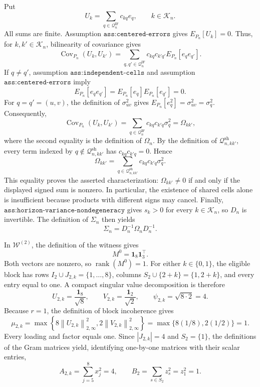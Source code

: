 Put
\[
 U_k=\sum_{q\in\mathcal Q_n^{\mathrm{IF}}}c_{kq}e_q,
 \qquad k\in\mathcal K_n.
\]
All sums are finite.  Assumption \(\texttt{ass:centered-errors}\) gives
\(E_{P_n}[U_k]=0\).  Thus, for \(k,k'\in\mathcal K_n\), bilinearity of
covariance gives
\[
 \operatorname{Cov}_{P_n}(U_k,U_{k'})
 =\sum_{q,q'\in\mathcal Q_n^{\mathrm{IF}}}
 c_{kq}c_{k'q'}E_{P_n}[e_qe_{q'}].
\]
If \(q\ne q'\), assumption \(\texttt{ass:independent-cells}\) and
assumption \(\texttt{ass:centered-errors}\) imply
\[
 E_{P_n}[e_qe_{q'}]
 =E_{P_n}[e_q]E_{P_n}[e_{q'}]=0.
\]
For \(q=q'=(u,v)\), the definition of \(\sigma_{uv}^2\) gives
\(E_{P_n}[e_q^2]=\sigma_{uv}^2=\sigma_q^2\).  Consequently,
\[
 \operatorname{Cov}_{P_n}(U_k,U_{k'})
 =\sum_{q\in\mathcal Q_n^{\mathrm{IF}}}c_{kq}c_{k'q}\sigma_q^2
 =\Omega_{kk'},
\]
where the second equality is the definition of \(\Omega_n\).  By the
definition of \(\mathcal Q_{n,kk'}^{\mathrm{sh}}\), every term indexed by
\(q\notin\mathcal Q_{n,kk'}^{\mathrm{sh}}\) has
\(c_{kq}c_{k'q}=0\).  Hence
\[
 \Omega_{kk'}
 =\sum_{q\in\mathcal Q_{n,kk'}^{\mathrm{sh}}}
 c_{kq}c_{k'q}\sigma_q^2.
\]
This equality proves the asserted characterization: \(\Omega_{kk'}\ne0\)
if and only if the displayed signed sum is nonzero.  In particular, the
existence of shared cells alone is insufficient because products with
different signs may cancel.  Finally,
\(\texttt{ass:horizon-variance-nondegeneracy}\) gives \(s_k>0\) for every
\(k\in\mathcal K_n\), so \(D_n\) is invertible.  The definition of
\(\Sigma_n\) then yields
\[
 \Sigma_n=D_n^{-1}\Omega_nD_n^{-1}.
\]

In \(\mathcal W^{(2)}\), the definition of the witness gives
\[
 M^0=\mathbf 1_8\mathbf 1_3^{\top}.
\]
Both vectors are nonzero, so \(\operatorname{rank}(M^0)=1\).  For either
\(k\in\{0,1\}\), the eligible block has rows
\(I_2\cup J_{2,k}=\{1,\ldots,8\}\), columns
\(S_2\cup\{2+k\}=\{1,2+k\}\), and every entry equal to one.  A compact
singular value decomposition is therefore
\[
 U_{2,k}=\frac{\mathbf 1_8}{\sqrt 8},
 \qquad
 V_{2,k}=\frac{\mathbf 1_2}{\sqrt 2},
 \qquad
 \psi_{2,k}=\sqrt{8\cdot2}=4.
\]
Because \(r=1\), the definition of block incoherence gives
\[
 \mu_{2,k}
 =\max\!\left\{
 8\left\|U_{2,k}\right\|_{2,\infty}^2,
 2\left\|V_{2,k}\right\|_{2,\infty}^2
 \right\}
 =\max\{8(1/8),2(1/2)\}=1.
\]
Every loading and factor equals one.  Since \(|J_{2,k}|=4\) and
\(S_2=\{1\}\), the definitions of the Gram matrices yield, identifying
one-by-one matrices with their scalar entries,
\[
 A_{2,k}=\sum_{j=5}^{8}x_j^2=4,
 \qquad
 B_2=\sum_{s\in S_2}z_s^2=z_1^2=1.
\]

